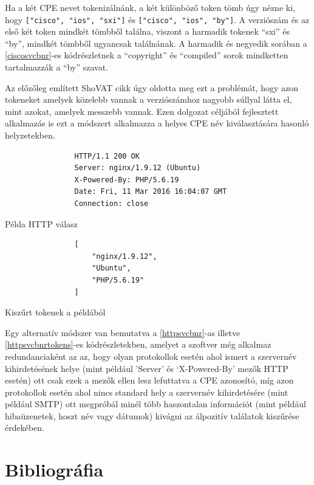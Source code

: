 \documentclass[a4paper,12pt]{article}
\begin{document}
	Ha a két CPE nevet tokenizálnánk, a két különböző token tömb úgy nézne ki, hogy \texttt{["cisco", "ios", "sxi"]} és \texttt{["cisco", "ios", "by"]}. A verziószám és az első két token mindkét tömbből találna, viszont a harmadik tokenek ``sxi'' és ``by'', mindkét tömbből ugyancsak találnának. A harmadik és negyedik sorában a \ref{ciscosvcbnr}-es kódrészletnek a ``copyright'' és ``compiled'' sorok mindketten tartalmazzák a ``by'' szavat.

	Az előzőleg említett ShoVAT\cite{shovat15} cikk úgy oldotta meg ezt a problémát, hogy azon tokeneket amelyek közelebb vannak a verziószámhoz nagyobb súllyal látta el, mint azokat, amelyek messzebb vannak. Ezen dolgozat céljából fejlesztett alkalmazás is ezt a módszert alkalmazza a helyes CPE név kiválasztására hasonló helyzetekben.
	
	\begin{multicols}{2}
		\begin{listing}[H]
			\begin{verbatim}
				HTTP/1.1 200 OK
				Server: nginx/1.9.12 (Ubuntu)
				X-Powered-By: PHP/5.6.19
				Date: Fri, 11 Mar 2016 16:04:07 GMT
				Connection: close
			\end{verbatim}
			\caption{Példa HTTP válasz}
			\label{httpsvcbnr}
		\end{listing}
		\begin{listing}[H]
			\begin{verbatim}
				[
					"nginx/1.9.12",
					"Ubuntu",
					"PHP/5.6.19"
				]
			\end{verbatim}
			\caption{Kiszűrt tokenek a példából}
			\label{httpsvcbnrtokens}
		\end{listing}
	\end{multicols}
	
	Egy alternatív módszer van bemutatva a \ref{httpsvcbnr}-as illetve \ref{httpsvcbnrtokens}-es kódrészletekben, amelyet a szoftver még alkalmaz redundanciaként az az, hogy olyan protokollok esetén ahol ismert a szervernév kihirdetésének helye (mint például 'Server' és `X-Powered-By' mezők HTTP esetén) ott csak ezek a mezők ellen lesz lefuttatva a CPE azonosító, míg azon protokollok esetén ahol nincs standard hely a szervernév kihirdetésére (mint például SMTP) ott megpróbál minél több haszontalan információt (mint például hibaüzenetek, hoszt név vagy dátumok) kivágni az álpozitív találatok kiszűrése érdekében.

\newpage
\section{Bibliográfia}

	\begingroup
	\renewcommand{\section}[2]{}
	\renewcommand{\markboth}[2]{}
		
		
	\endgroup
\end{document}
